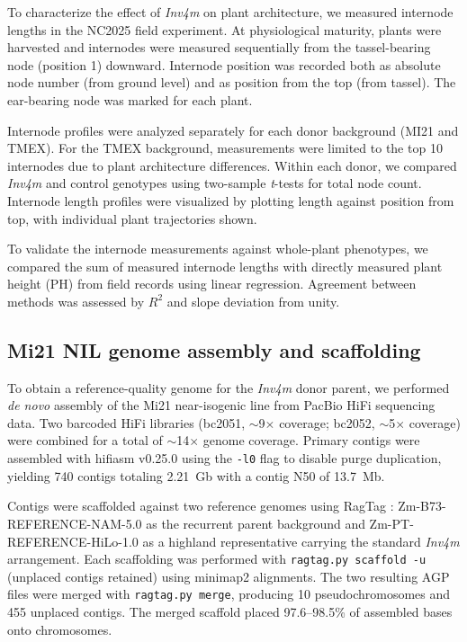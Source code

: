 \documentclass[9pt,twocolumn,twoside]{rilabRxiv}
\newcommand{\invfour}{\textit{Inv4m}\xspace}
\begin{document}
To characterize the effect of \invfour on plant architecture, we measured internode lengths in the NC2025 field experiment.
At physiological maturity, plants were harvested and internodes were measured sequentially from the tassel-bearing node (position 1) downward.
Internode position was recorded both as absolute node number (from ground level) and as position from the top (from tassel).
The ear-bearing node was marked for each plant.

Internode profiles were analyzed separately for each donor background (MI21 and TMEX).
For the TMEX background, measurements were limited to the top 10 internodes due to plant architecture differences.
Within each donor, we compared \invfour and control genotypes using two-sample \textit{t}-tests for total node count.
Internode length profiles were visualized by plotting length against position from top, with individual plant trajectories shown.

To validate the internode measurements against whole-plant phenotypes, we compared the sum of measured internode lengths with directly measured plant height (PH) from field records using linear regression.
Agreement between methods was assessed by $R^2$ and slope deviation from unity.

\subsection{Mi21 NIL genome assembly and scaffolding}

To obtain a reference-quality genome for the \invfour donor parent, we performed \textit{de novo} assembly of the Mi21 near-isogenic line from PacBio HiFi sequencing data.
Two barcoded HiFi libraries (bc2051, $\sim$9$\times$ coverage; bc2052, $\sim$5$\times$ coverage) were combined for a total of $\sim$14$\times$ genome coverage.
Primary contigs were assembled with hifiasm v0.25.0 \cite{cheng2021hifiasm} using the \texttt{-l0} flag to disable purge duplication, yielding 740 contigs totaling 2.21~Gb with a contig N50 of 13.7~Mb.

Contigs were scaffolded against two reference genomes using RagTag \cite{alonge2022}: Zm-B73-REFERENCE-NAM-5.0 \cite{hufford2021} as the recurrent parent background and Zm-PT-REFERENCE-HiLo-1.0 as a highland representative carrying the standard \invfour arrangement.
Each scaffolding was performed with \texttt{ragtag.py scaffold -u} (unplaced contigs retained) using minimap2 \cite{li2018minimap2} alignments.
The two resulting AGP files were merged with \texttt{ragtag.py merge}, producing 10 pseudochromosomes and 455 unplaced contigs.
The merged scaffold placed 97.6--98.5\% of assembled bases onto chromosomes.
\end{document}

